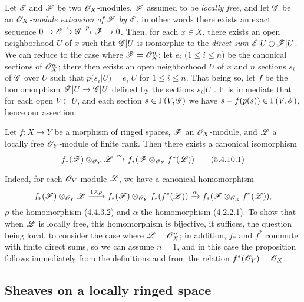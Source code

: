 \begin{env}[5.4.9]
\label{0.5.4.9}
Let $\mathscr{E}$ and $\mathscr{F}$ be two $\mathscr{O}_X$-modules, $\mathscr{F}$ assumed to be \emph{locally free}, and let $\mathscr{G}$ be an \emph{$\mathscr{O}_X$-module extension of $\mathscr{F}$ by $\mathscr{E}$}, in other words there exists an exact sequence $0\to\sh{E}\xrightarrow{i}\sh{G}\xrightarrow{p}\sh{F}\to 0$.
Then, for each $x\in X$, there exists an open neighborhood $U$ of $x$ such that $\mathscr{G}|U$ is isomorphic to the \emph{direct sum $\mathscr{E}|U\oplus\mathscr{F}|U$}.
We can reduce to the case where $\mathscr{F}=\mathscr{O}_X^n$; let $e_i$ ($1\leqslant i\leqslant n$) be the canonical sections  of $\mathscr{O}_X^n$; there then exists an open neighborhood $U$ of $x$ and $n$ sections $s_i$ of $\mathscr{G}$ over $U$ such that $p(s_i|U)=e_i|U$ for $1\leqslant i\leqslant n$.
That being so, let $f$ be the homomorphism $\sh{F}|U\to\sh{G}|U$ defined by the sections $s_i|U$ .
It is immediate that for each open $V\subset U$, and each section $s\in\Gamma(V,\mathscr{G})$ we have $s-f(p(s))\in\Gamma(V,\mathscr{E})$, hence our assertion.
\end{env}

\begin{env}[5.4.10]
\label{0.5.4.10}
Let $f:X\to Y$ be a morphism of ringed spaces, $\mathscr{F}$ an $\mathscr{O}_X$-module, and $\mathscr{L}$ a locally free $\mathscr{O}_Y$-module of finite rank.
Then there exists a canonical isomorphism
\[
  f_*(\mathscr{F})\otimes_{\mathscr{O}_Y}\mathscr{L}\xrightarrow{\sim} f_*(\mathscr{F}\otimes_{\mathscr{O}_X}f^*(\mathscr{L}))
  \tag{5.4.10.1}
\]

Indeed, for each $\mathscr{O}_Y$-module $\mathscr{L}$, we have a canonical homomorphism
\[
  f_*(\mathscr{F})\otimes_{\mathscr{O}_Y}\mathscr{L}\xrightarrow{1\otimes\rho}f_*(\mathscr{F})\otimes_{\mathscr{O}_Y}f_*(f^*(\mathscr{L}))\xrightarrow{\alpha}f_*(\mathscr{F}\otimes_{\mathscr{O}_X}f^*(\mathscr{L})),
\]
$\rho$ the homomorphism (4.4.3.2) and $\alpha$ the homomorphism (4.2.2.1).
To show that when $\mathscr{L}$ is locally free, this homomorphism is bijective, it suffices, the question being local, to consider the case where $\mathscr{L}=\mathscr{O}_X^n$;
in addition, $f_*$ and $f^*$ commute with finite direct sums, so we can assume $n=1$, and in this case the proposition follows immediately from the definitions and from the relation $f^*(\mathscr{O}_Y)=\mathscr{O}_X$.
\end{env}

\subsection{Sheaves on a locally ringed space}
\label{subsection-sheaves-on-lrs}


